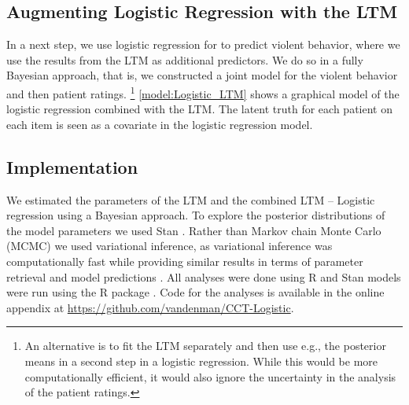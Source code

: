 \documentclass[a4paper,11pt]{article}
\newcommand{\githuburl}{\url{https://github.com/vandenman/CCT-Logistic}}
\begin{document}
\subsection{Augmenting Logistic Regression with the LTM}
In a next step, we use logistic regression for to predict violent behavior, where we use the results from the LTM as additional predictors.
We do so in a fully Bayesian approach, that is, we constructed a joint model for the violent behavior and then patient ratings.%
\footnote{%
An alternative is to fit the LTM separately and then use e.g., the posterior means in a second step in a logistic regression.
While this would be more computationally efficient, it would also ignore the uncertainty in the analysis of the patient ratings.
}
\autoref{model:Logistic_LTM} shows a graphical model of the logistic regression combined with the LTM.
The latent truth for each patient on each item is seen as a covariate in the logistic regression model.

\subsection{Implementation}
We estimated the parameters of the LTM and the combined LTM -- Logistic regression using a Bayesian approach.
To explore the posterior distributions of the model parameters we used Stan \parencite{CarpenterEtAl2017Stan}. 
Rather than Markov chain Monte Carlo (MCMC) we used variational inference, as variational inference was computationally fast while providing similar results in terms of parameter retrieval and model predictions \parencite{kucukelbir2017automatic}. 
All analyses were done using R \parencite{R} and Stan models were run using the R package  \parencite{cmdstanr}. 
Code for the analyses is available in the online appendix at \githuburl{}.

\end{document}
